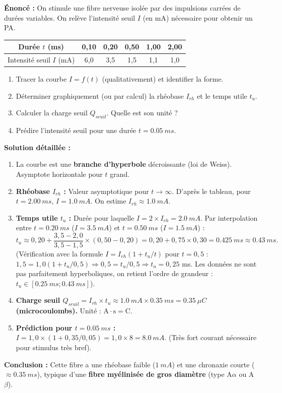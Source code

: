 \documentclass[11pt]{article}
\begin{document}
\begin{exoresolu}
\textbf{Énoncé :} On stimule une fibre nerveuse isolée par des impulsions carrées de durées variables. On relève l'intensité seuil $I$ (en mA) nécessaire pour obtenir un PA.
\begin{center}
\begin{tabular}{|c|c|c|c|c|c|}\hline
Durée $t$ (ms) & 0,10 & 0,20 & 0,50 & 1,00 & 2,00 \\ \hline
Intensité seuil $I$ (mA) & 6,0 & 3,5 & 1,5 & 1,1 & 1,0 \\ \hline
\end{tabular}
\end{center}
\begin{enumerate}
    \item Tracer la courbe $I = f(t)$ (qualitativement) et identifier la forme.
    \item Déterminer graphiquement (ou par calcul) la rhéobase $I_{rh}$ et le temps utile $t_u$.
    \item Calculer la charge seuil $Q_{seuil}$. Quelle est son unité ?
    \item Prédire l'intensité seuil pour une durée $t = \SI{0,05}{ms}$.
\end{enumerate}
\tcblower
\textbf{Solution détaillée :}
\begin{enumerate}
    \item La courbe est une \textbf{branche d'hyperbole} décroissante (loi de Weiss). Asymptote horizontale pour $t$ grand.
    \item \textbf{Rhéobase $I_{rh}$ :} Valeur asymptotique pour $t \to \infty$. D'après le tableau, pour $t=\SI{2,00}{ms}$, $I=\SI{1,0}{mA}$. On estime $I_{rh} \approx \SI{1,0}{mA}$.
    \item \textbf{Temps utile $t_u$ :} Durée pour laquelle $I = 2 \times I_{rh} = \SI{2,0}{mA}$. Par interpolation entre $t=\SI{0,20}{ms}$ ($I=\SI{3,5}{mA}$) et $t=\SI{0,50}{ms}$ ($I=\SI{1,5}{mA}$) :
    \[ t_u \approx 0,20 + \frac{3,5 - 2,0}{3,5 - 1,5} \times (0,50 - 0,20) = 0,20 + 0,75 \times 0,30 = \SI{0,425}{ms} \approx \SI{0,43}{ms}. \]
    (Vérification avec la formule $I = I_{rh}(1 + t_u/t)$ pour $t=0,5$ : $1,5 = 1,0(1 + t_u/0,5) \Rightarrow 0,5 = t_u/0,5 \Rightarrow t_u = 0,25$ ms. Les données ne sont pas parfaitement hyperboliques, on retient l'ordre de grandeur : $t_u \in [\SI{0,25}{ms}; \SI{0,43}{ms}]$).
    \item \textbf{Charge seuil $Q_{seuil} = I_{rh} \times t_u \approx \SI{1,0}{mA} \times \SI{0,35}{ms} = \SI{0,35}{\mu C}$ (microcoulombs).} Unité : $\text{A} \cdot \text{s} = \text{C}$.
    \item \textbf{Prédiction pour $t = \SI{0,05}{ms}$ :} $I = 1,0 \times (1 + 0,35 / 0,05) = 1,0 \times 8 = \SI{8,0}{mA}$. (Très fort courant nécessaire pour stimulus très bref).
\end{enumerate}
\textbf{Conclusion :} Cette fibre a une rhéobase faible ($\SI{1}{mA}$) et une chronaxie courte ($\approx \SI{0,35}{ms}$), typique d'une \textbf{fibre myélinisée de gros diamètre} (type A$\alpha$ ou A$\beta$).
\end{exoresolu}
\end{document}
